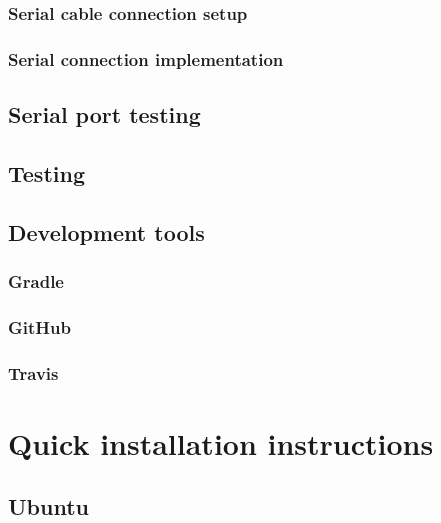 \documentclass[a4paper, 12pt]{article}
\begin{document}
\subsubsection{Serial cable connection setup}

\subsubsection{Serial connection implementation}

\subsection{Serial port testing}

\subsection{Testing}

\subsection{Development tools}

\subsubsection{Gradle}

\subsubsection{GitHub}

\subsubsection{Travis}


\section{Quick installation instructions}
\subsection{Ubuntu}




\end{document}
